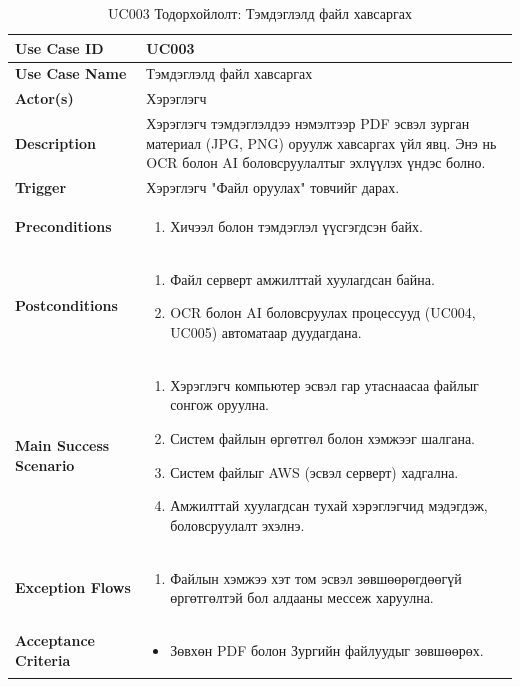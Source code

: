\begin{longtable}{|p{4cm}|p{11cm}|}
\caption{UC003 Тодорхойлолт: Тэмдэглэлд файл хавсаргах} \\
\hline
\textbf{Use Case ID} & UC003 \\ \hline
\textbf{Use Case Name} & Тэмдэглэлд файл хавсаргах \\ \hline
\textbf{Actor(s)} & Хэрэглэгч \\ \hline
\textbf{Description} & Хэрэглэгч тэмдэглэлдээ нэмэлтээр PDF эсвэл зурган материал (JPG, PNG) оруулж хавсаргах үйл явц. Энэ нь OCR болон AI боловсруулалтыг эхлүүлэх үндэс болно. \\ \hline
\textbf{Trigger} & Хэрэглэгч "Файл оруулах" товчийг дарах. \\ \hline
\textbf{Preconditions} & 
\begin{enumerate}
    \item Хичээл болон тэмдэглэл үүсгэгдсэн байх.
\end{enumerate} \\ \hline
\textbf{Postconditions} & 
\begin{enumerate}
    \item Файл серверт амжилттай хуулагдсан байна.
    \item OCR болон AI боловсруулах процессууд (UC004, UC005) автоматаар дуудагдана.
\end{enumerate} \\ \hline
\textbf{Main Success Scenario} & 
\begin{enumerate}
    \item Хэрэглэгч компьютер эсвэл гар утаснаасаа файлыг сонгож оруулна.
    \item Систем файлын өргөтгөл болон хэмжээг шалгана.
    \item Систем файлыг AWS (эсвэл серверт) хадгална.
    \item Амжилттай хуулагдсан тухай хэрэглэгчид мэдэгдэж, боловсруулалт эхэлнэ.
\end{enumerate} \\ \hline
\textbf{Exception Flows} & 
\begin{enumerate}
    \item[2a.] Файлын хэмжээ хэт том эсвэл зөвшөөрөгдөөгүй өргөтгөлтэй бол алдааны мессеж харуулна.
\end{enumerate} \\ \hline
\textbf{Acceptance Criteria} & 
\begin{itemize}
    \item Зөвхөн PDF болон Зургийн файлуудыг зөвшөөрөх.
\end{itemize} \\ \hline
\end{longtable}


